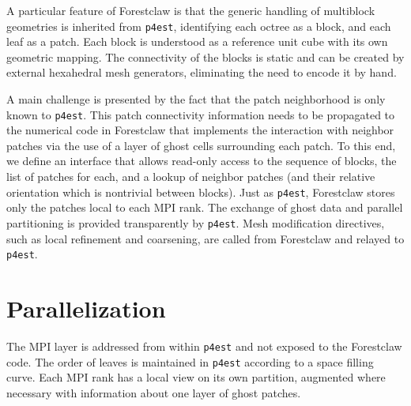 \documentclass{IOS-Book-Article}     %
\newcommand{\forestclaw}{Forestclaw\xspace}
\newcommand{\pforest}{\texttt{p4est}\xspace}
\begin{document}
A particular feature of \forestclaw is that the generic handling of multiblock
geometries is inherited from \pforest, identifying each octree as a block, and
each leaf as a patch.  Each block is understood as a reference unit cube with
its own geometric mapping.  The connectivity of the blocks is static and can be
created by external hexahedral mesh generators, eliminating the need to encode
it by hand.

A main challenge is presented by the fact that the patch neighborhood
is only known to \pforest.  This patch connectivity information needs
to be propagated to the numerical code in \forestclaw that implements
the interaction with neighbor patches via the use of a layer of ghost
cells surrounding each patch.  To this end, we define an interface
that allows read-only access to the sequence of blocks,
the list of patches for each, and a lookup of neighbor patches (and
their relative orientation which is nontrivial between blocks).
Just as \pforest, \forestclaw stores only the patches local to each
MPI rank.  The exchange of ghost data and parallel partitioning is provided
transparently by \pforest.  Mesh modification directives, such as
local refinement and coarsening, are called from \forestclaw and
relayed to \pforest.








\section{Parallelization}

The MPI layer is addressed from within \pforest and not exposed to the
\forestclaw code.  The order of leaves is maintained in \pforest according to a
space filling curve.  Each MPI rank has a local view on its own partition,
augmented where necessary with information about one layer of ghost patches.
\end{document}
